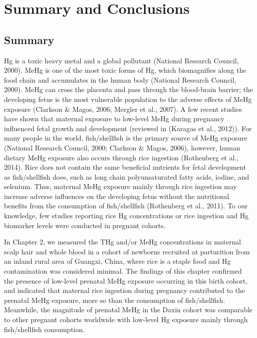 \chapter{Summary and Conclusions}

\section{Summary}

Hg is a toxic heavy metal and a global pollutant (National Research Council, 2000). MeHg is one of the most toxic forms of Hg, which biomagnifies along the food chain and accumulates in the human body (National Research Council, 2000). MeHg can cross the placenta and pass through the blood-brain barrier; the developing fetus is the most vulnerable population to the adverse effects of MeHg exposure (Clarkson \& Magos, 2006; Mergler et al., 2007). A few recent studies have shown that maternal exposure to low-level MeHg during pregnancy influenced fetal growth and development (reviewed in (Karagas et al., 2012)). For many people in the world, fish/shellfish is the primary source of MeHg exposure (National Research Council, 2000; Clarkson \& Magos, 2006), however, human dietary MeHg exposure also occurs through rice ingestion (Rothenberg et al., 2014). Rice does not contain the same beneficial nutrients for fetal development as fish/shellfish does, such as long chain polyunsaturated fatty acids, iodine, and selenium. Thus, maternal MeHg exposure mainly through rice ingestion may increase adverse influences on the developing fetus without the nutritional benefits from the consumption of fish/shellfish (Rothenberg et al., 2011). To our knowledge, few studies reporting rice Hg concentrations or rice ingestion and Hg biomarker levels were conducted in pregnant cohorts.

In Chapter 2, we measured the THg and/or MeHg concentrations in maternal scalp hair and whole blood in a cohort of newborns recruited at parturition from an inland rural area of Guangxi, China, where rice is a staple food and Hg contamination was considered minimal. The findings of this chapter confirmed the presence of low-level prenatal MeHg exposure occurring in this birth cohort, and indicated that maternal rice
ingestion during pregnancy contributed to the prenatal MeHg exposure, more so than the consumption of fish/shellfish. Meanwhile, the magnitude of prenatal MeHg in the Daxin cohort was comparable to other pregnant cohorts worldwide with low-level Hg exposure mainly through fish/shellfish consumption.

